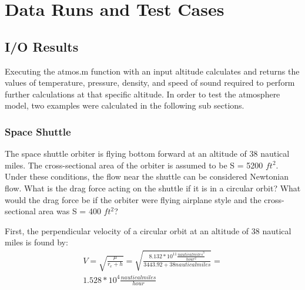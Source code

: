\documentclass[12pt]{report}
\begin{document}
\section{Data Runs and Test Cases}
\doublespacing


\subsection{I/O Results}
Executing the atmos.m function with an input altitude calculates and returns the values of temperature, pressure, density, and speed of sound required to perform further calculations at that specific altitude. In order to test the atmosphere model, two examples were calculated in the following sub sections.

\subsubsection{Space Shuttle}
The space shuttle orbiter is flying bottom forward at an altitude of 38 nautical miles. The cross-sectional area of the orbiter is assumed to be S = 5200 \(ft^2\). Under these conditions, the flow near the shuttle can be considered Newtonian flow. What is the drag force acting on the shuttle if it is in a circular orbit? What would the drag force be if the orbiter were flying airplane style and the cross-sectional area was S = 400 \(ft^2\)?

First, the perpendicular velocity of a circular orbit at an altitude of 38 nautical miles is found by:
\begin{equation}
\begin{split}
	V = \sqrt{\frac{\mu}{r_{e}+h}} = 
		\sqrt{\frac{8.132 * 10^{11} \frac{{nautical miles}^3}{hour^2}}
			{3443.92 + 38 {nautical miles}}} 
			= \\ 1.528 * 10^4 \frac{nautical miles}{hour}
	\label{equation:shuttle}
\end{split}
\end{equation}
\end{document}
